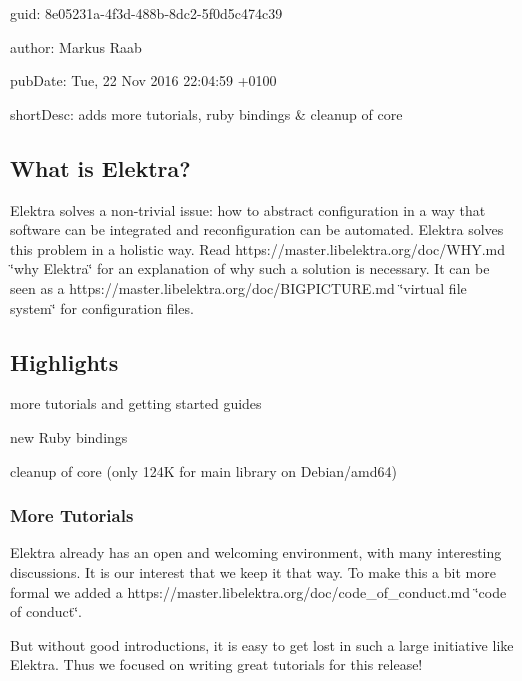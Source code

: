 
\begin{DoxyItemize}
\item guid\+: 8e05231a-\/4f3d-\/488b-\/8dc2-\/5f0d5c474c39
\item author\+: Markus Raab
\item pub\+Date\+: Tue, 22 Nov 2016 22\+:04\+:59 +0100
\item short\+Desc\+: adds more tutorials, ruby bindings \& cleanup of core
\end{DoxyItemize}

\subsection*{What is Elektra?}

Elektra solves a non-\/trivial issue\+: how to abstract configuration in a way that software can be integrated and reconfiguration can be automated. Elektra solves this problem in a holistic way. Read https\+://master.libelektra.\+org/doc/\+W\+HY.md \char`\"{}why Elektra\char`\"{} for an explanation of why such a solution is necessary. It can be seen as a https\+://master.libelektra.\+org/doc/\+B\+I\+G\+P\+I\+C\+T\+U\+RE.md \char`\"{}virtual file system\char`\"{} for configuration files.

\subsection*{Highlights}


\begin{DoxyItemize}
\item more tutorials and getting started guides
\item new Ruby bindings
\item cleanup of core (only 124K for main library on Debian/amd64)
\end{DoxyItemize}

\subsubsection*{More Tutorials}

Elektra already has an open and welcoming environment, with many interesting discussions. It is our interest that we keep it that way. To make this a bit more formal we added a https\+://master.libelektra.\+org/doc/code\+\_\+of\+\_\+conduct.md \char`\"{}code of
conduct\char`\"{}.

But without good introductions, it is easy to get lost in such a large initiative like Elektra. Thus we focused on writing great tutorials for this release!


